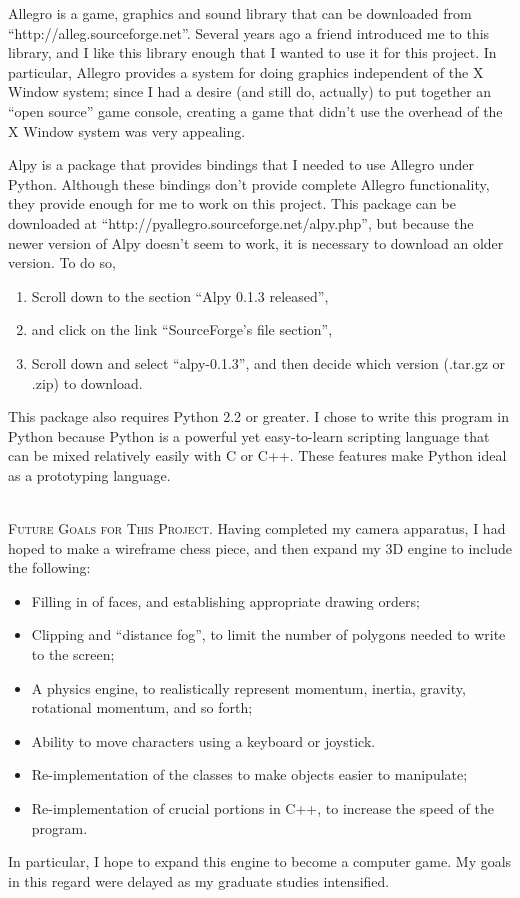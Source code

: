 \documentclass[12pt]{article}
\newcommand{\normaltitleize}[1]{\mbox{}\\ \textsc{#1} \normalsize}
\begin{document}
Allegro is a game, graphics and sound library that can be downloaded from ``http://alleg.sourceforge.net''.  Several years ago a friend introduced me to this library, and I like this library enough that I wanted to use it for this project.  In particular, Allegro provides a system for doing graphics independent of the X Window system; since I had a desire (and still do, actually) to put together an ``open source'' game console, creating a game that didn't use the overhead of the X Window system was very appealing.

Alpy is a package that provides bindings that I needed to use Allegro under Python.  Although these bindings don't provide complete Allegro functionality, they provide enough for me to work on this project.  This package can be downloaded at ``http://pyallegro.sourceforge.net/alpy.php'', but because the newer version of Alpy doesn't seem to work, it is necessary to download an older version.  To do so,
\begin{enumerate}
   \item Scroll down to the section ``Alpy 0.1.3 released'',

   \item and click on the link ``SourceForge's file section'',

   \item Scroll down and select ``alpy-0.1.3'', and then decide which version (.tar.gz or .zip) to download.
\end{enumerate}

This package also requires Python 2.2 or greater.  I chose to write this program in Python because Python is a powerful yet easy-to-learn scripting language that can be mixed relatively easily with C or C++.  These features make Python ideal as a prototyping language.

\normaltitleize{Future Goals for This Project.}  Having completed my camera apparatus, I had hoped to make a wireframe chess piece, and then expand my 3D engine to include the following:
\begin{itemize}
   \item Filling in of faces, and establishing appropriate drawing orders;

   \item Clipping and ``distance fog'', to limit the number of polygons needed to write to the screen;

   \item A physics engine, to realistically represent momentum, inertia, gravity, rotational momentum, and so forth;

   \item Ability to move characters using a keyboard or joystick.

   \item Re-implementation of the classes to make objects easier to manipulate;

   \item Re-implementation of crucial portions in C++, to increase the speed of the program.
\end{itemize}
In particular, I hope to expand this engine to become a computer game.  My goals in this regard were delayed as my graduate studies intensified.
\end{document}
